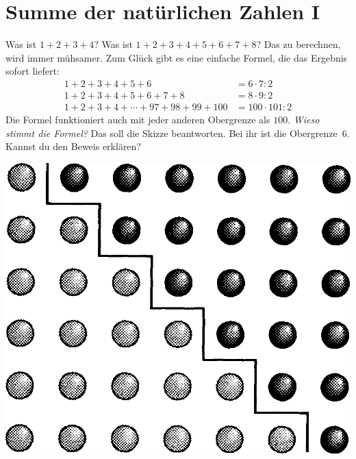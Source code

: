 \documentclass{../../zirkelblatt}
\begin{document}
\section*{Summe der natürlichen Zahlen I}
Was ist $1 + 2 + 3 + 4$? Was ist $1 + 2 + 3 + 4 + 5 + 6 + 7 + 8$? Das zu
berechnen, wird immer mühsamer. Zum Glück gibt es eine einfache Formel, die das
Ergebnis sofort liefert:
\begin{align*}
  1 + 2 + 3 + 4 + 5 + 6 \phantom{{} + 7 + 8} &= 6 \cdot 7 : 2 \\
  1 + 2 + 3 + 4 + 5 + 6 + 7 + 8 &= 8 \cdot 9 : 2 \\
  1 + 2 + 3 + 4 + \cdots + 97 + 98 + 99 + 100 &= 100 \cdot 101 : 2
\end{align*}
Die Formel funktioniert auch mit jeder anderen Obergrenze als $100$. \emph{Wieso
stimmt die Formel?} Das soll die Skizze beantworten. Bei ihr ist die
Obergrenze~$6$. Kannst du den Beweis erklären?
\begin{center}
\includegraphics[scale=0.3]{kleiner-gauss-1}
\end{center}
\end{document}

